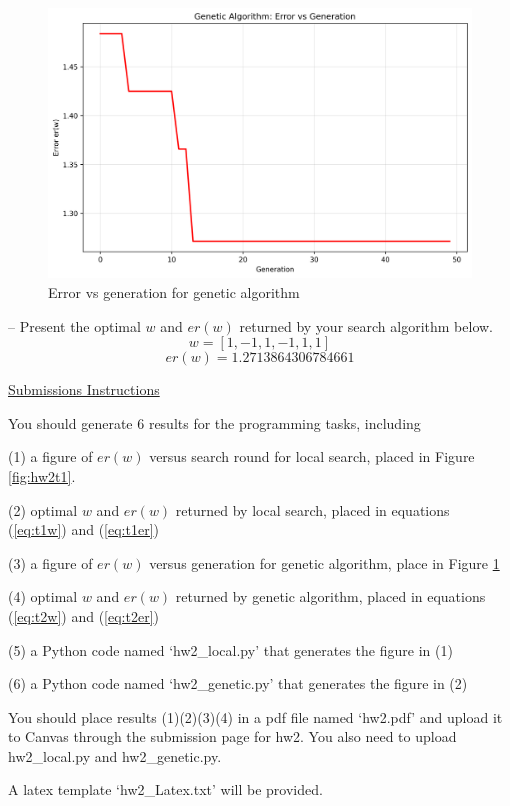 \documentclass[a4paper, 11pt]{article}
\begin{document}
\begin{figure}[h!]
    \centering
    \includegraphics[width=0.8\linewidth]{../../genetic_algorithm_error.png}
    \caption{Error vs generation for genetic algorithm}
    \label{fig:hw2t2}
\end{figure}

-- Present the optimal $w$ and $er(w)$ returned by your search algorithm below. 
\begin{equation}
\label{eq:t2w}
w = [1, -1, 1, -1, 1, 1]
\end{equation}
\begin{equation}
\label{eq:t2er}
er(w) = 1.2713864306784661
\end{equation}

\underline{Submissions Instructions}

You should generate 6 results for the programming tasks, including 

(1) a figure of $er(w)$ versus search round for local search, 
placed in Figure \ref{fig:hw2t1}.

(2) optimal $w$ and $er(w)$ returned by local search, 
placed in equations (\ref{eq:t1w}) and (\ref{eq:t1er})

(3) a figure of $er(w)$ versus generation for genetic algorithm, place in Figure \ref{fig:hw2t2} 

(4) optimal $w$ and $er(w)$ returned by genetic algorithm, 
placed in equations (\ref{eq:t2w}) and (\ref{eq:t2er})

(5) a Python code named `hw2\_local.py' that generates 
the figure in (1) 

(6) a Python code named `hw2\_genetic.py' that generates the figure in (2)

You should place results (1)(2)(3)(4) in a pdf 
file named `hw2.pdf' and upload it to Canvas 
through the submission page for hw2. You also need 
to upload hw2\_local.py and hw2\_genetic.py. 

A latex template `hw2\_Latex.txt' will be provided. 
\end{document}
